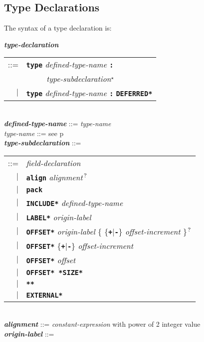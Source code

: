 \documentclass[12pt]{article}
\newcommand{\TT}[1]{{\tt \bfseries #1}}
\newcommand{\STAR}{{\Large $^\star$}}
\newcommand{\QMARK}{{$^{\,\mbox{\footnotesize ?}}$}}
\newcommand{\ttkey}[1]{{\tt \bfseries #1}}
\newcommand{\emkey}[1]{{\em \bfseries #1}}
\newcommand{\pagref}[1]{p\pageref{#1}}
\newenvironment{indpar}[1][0.3in]%
	{\begin{list}{}%
		     {\setlength{\itemsep}{0in}%
		      \setlength{\topsep}{0in}%
		      \setlength{\parsep}{1ex}%
		      \setlength{\labelwidth}{#1}%
		      \setlength{\leftmargin}{#1}%
		      \addtolength{\leftmargin}{\labelsep}}%
	 \item}%
	{\end{list}}
\begin{document}
\subsection{Type Declarations}
\label{TYPE-DECLARATIONS}

The syntax of a type declaration is:

\begin{indpar}
\emkey{type-declaration}\label{TYPE-DECLARATION}
    \begin{tabular}[t]{rl}
    ::= & \ttkey{type} {\em defined-type-name} \TT{:} \\
	& \TT{~~~~~}{\em type-subdeclaration}\STAR{} \\
    $|$ & \ttkey{type} {\em defined-type-name} \TT{:} \ttkey{*DEFERRED*} \\
    \end{tabular} \\
\emkey{defined-type-name} ::= {\em type-name} \\
{\em type-name} ::= see \pagref{TYPE-NAME}
\\[2ex]
\emkey{type-subdeclaration} ::= \\
\hspace*{0.5in}%
    \begin{tabular}[t]{@{}rl}
    ::= &  {\em field-declaration} \\
    $|$ &  \ttkey{align} {\em alignment}\QMARK{} \\
    $|$ &  \ttkey{pack} \\
    $|$ &  \ttkey{*INCLUDE*} {\em defined-type-name} \\
    $|$ &  \ttkey{*LABEL*} {\em origin-label} \\
    $|$ &  \ttkey{*OFFSET*} {\em origin-label} \{ \{\TT{+}|\TT{-}\}
                            {\em offset-increment} \}\QMARK{} \\
    $|$ &  \ttkey{*OFFSET*} \{\TT{+}|\TT{-}\}
                            {\em offset-increment} \\
    $|$ &  \ttkey{*OFFSET*} {\em offset} \\
    $|$ &  \ttkey{*OFFSET* *SIZE*} \\
    $|$ &  \ttkey{***} \\
    $|$ &  \ttkey{*EXTERNAL*} \\
    \end{tabular}
\\[2ex]
\emkey{alignment} ::= {\em constant-expression}
		      with power of 2 integer value \\
\emkey{origin-label}\label{ORIGIN-LABEL} ::=

\end{indpar}
\end{document}
